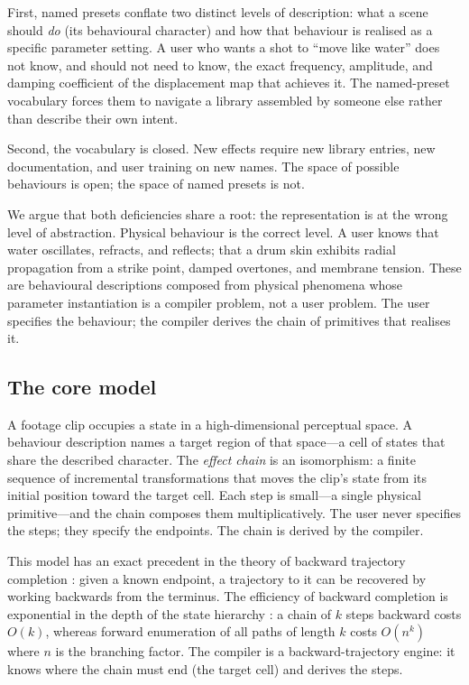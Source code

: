 \documentclass[twocolumn,11pt,a4paper]{article}
\theoremstyle{mee}
\theoremstyle{definition}
\theoremstyle{remark}
\begin{document}
First, named presets conflate two distinct levels of description: what a
scene should \emph{do} (its behavioural character) and how that behaviour
is realised as a specific parameter setting. A user who wants a shot to
``move like water'' does not know, and should not need to know, the exact
frequency, amplitude, and damping coefficient of the displacement map that
achieves it. The named-preset vocabulary forces them to navigate a library
assembled by someone else rather than describe their own intent.

Second, the vocabulary is closed. New effects require new library entries,
new documentation, and user training on new names. The space of possible
behaviours is open; the space of named presets is not.

We argue that both deficiencies share a root: the representation is at the
wrong level of abstraction. Physical behaviour is the correct level. A
user knows that water oscillates, refracts, and reflects; that a drum skin
exhibits radial propagation from a strike point, damped overtones, and
membrane tension. These are behavioural descriptions composed from physical
phenomena whose parameter instantiation is a compiler problem, not a user
problem. The user specifies the behaviour; the compiler derives the chain
of primitives that realises it.

\subsection{The core model}

A footage clip occupies a state in a high-dimensional perceptual space.
A behaviour description names a target region of that space---a cell of
states that share the described character. The \emph{effect chain} is an
isomorphism: a finite sequence of incremental transformations that moves
the clip's state from its initial position toward the target cell. Each
step is small---a single physical primitive---and the chain composes them
multiplicatively. The user never specifies the steps; they specify the
endpoints. The chain is derived by the compiler.

This model has an exact precedent in the theory of backward trajectory
completion \citep{poincare1890,wiener1948}: given a known endpoint, a
trajectory to it can be recovered by working backwards from the terminus.
The efficiency of backward completion is exponential in the depth of the
state hierarchy \citep{sutton1988,bellman1957}: a chain of $k$ steps
backward costs $O(k)$, whereas forward enumeration of all paths of length
$k$ costs $O(n^k)$ where $n$ is the branching factor. The compiler is a
backward-trajectory engine: it knows where the chain must end (the target
cell) and derives the steps.
\end{document}
